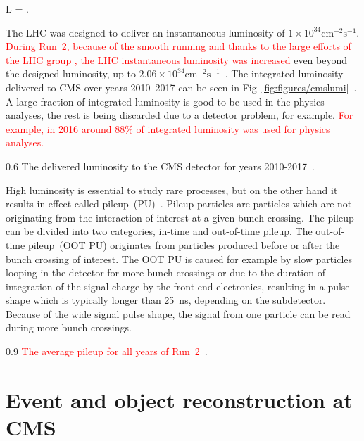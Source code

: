 {
 L = .
}

The LHC was designed to deliver an instantaneous luminosity of $1 \times 10^{34} \mathrm{cm^{-2}s^{-1}}$.  \textcolor{red}{During Run~2, because of the smooth running and thanks to the large efforts of the LHC group , the LHC instantaneous luminosity was increased}  even beyond the designed luminosity, up to $2.06 \times 10^{34} \mathrm{cm^{-2}s^{-1}}$~\cite{website:CMSlumi}. The integrated luminosity delivered to CMS over years 2010--2017 can be seen in Fig~\ref{fig:figures/cmslumi}~\cite{website:CMSlumi}. A large fraction of integrated luminosity is good to be used in the physics analyses, the rest is being discarded due to a detector problem, for example. \textcolor{red}{For example, in 2016 around 88\% of integrated luminosity was used for physics analyses.} 


                 {0.6}       %
                 { The delivered luminosity to the CMS detector for years 2010-2017~\cite{website:CMSlumi}. }


High luminosity is essential to study rare processes, but on the other hand it results in effect called pileup~(PU)~\cite{Bayatian:2006nff}. Pileup particles are particles which are not originating from the interaction of interest at a given bunch crossing. The pileup can be divided into two categories, in-time and out-of-time pileup.   The out-of-time pileup~(OOT PU) originates from particles produced before or after the bunch crossing of interest. The OOT PU is caused for example by slow particles looping in the detector for more bunch crossings or due to the duration of integration of the signal charge by the front-end electronics, resulting in a pulse shape which is typically longer than 25~ns, depending on the subdetector. Because of the wide signal pulse shape, the signal from one particle can be read during more bunch crossings.

                 {0.9}       %
                 { \textcolor{red}{The average pileup for all years of Run~2~\cite{website:CMSlumi}}. }

\section{Event and object reconstruction at CMS~\label{sec:objects}}

